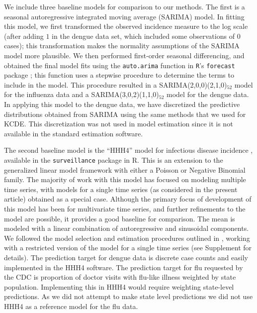 \documentclass[times, doublespace]{simauth}\usepackage[]{graphicx}\usepackage[]{color}
\begin{document}
We include three baseline models for comparison to our methods.  The first is a
seasonal autoregressive integrated moving average (SARIMA) model.  In fitting this model, we first
transformed the observed incidence measure to the log scale (after adding $1$ in
the dengue data set, which included some observations of $0$ cases); this
transformation makes the normality assumptions of the SARIMA model more plausible.
We then performed first-order seasonal differencing, and obtained the final
model fits using the {\tt auto.arima} function in {\tt R}'s {\tt forecast}
package \cite{hyndmanRForecastPackage}; this function uses a stepwise
procedure to determine the terms to include in the model.
This procedure resulted in a
SARIMA(2,0,0)(2,1,0)$_{52}$
model for the influenza data and a
SARIMA(3,0,2)(1,1,0)$_{52}$
model for the dengue data.  In applying this model to the dengue data, we have
discretized the predictive distributions obtained from SARIMA using the same
methods that we used for KCDE.  This discretization was not used in model
estimation since it is not available in the standard estimation software.

The second baseline model is the ``HHH4'' model for infectious disease incidence
\cite{Held2005HHHIntro, Paul2008MultivariateHHH4, Held2012HHHSeasonality},
available in the {\tt surveillance} \cite{Hohle:R:surveillance} package in R.
This is an extension to the generalized linear model framework with either a Poisson or Negative Binomial family.
The majority of work with this model has focused on modeling multiple time series,
with models for a single time series (as considered in the present article)
obtained as a special case.  Although the primary focus of development of this
model has been for multivariate time series, and further refinements to the model
are possible, it provides a good baseline for comparison.
The mean is modeled with a linear combination of autoregressive and sinusoidal components.
We followed the model selection and estimation procedures outlined in \cite{Held2012HHHSeasonality},
working with a restricted version of the model for a single time series
(see Supplement for details).  The prediction target for dengue data is
discrete case counts and easily implemented in the HHH4 software.  The prediction target for
flu requested by the CDC is proportion of doctor visits with flu-like
illness weighted by state population.  Implementing this in HHH4
would require weighting state-level predictions.  As we did not attempt
to make state level predictions we did not use HHH4 as a reference
model for the flu data.
\end{document}
